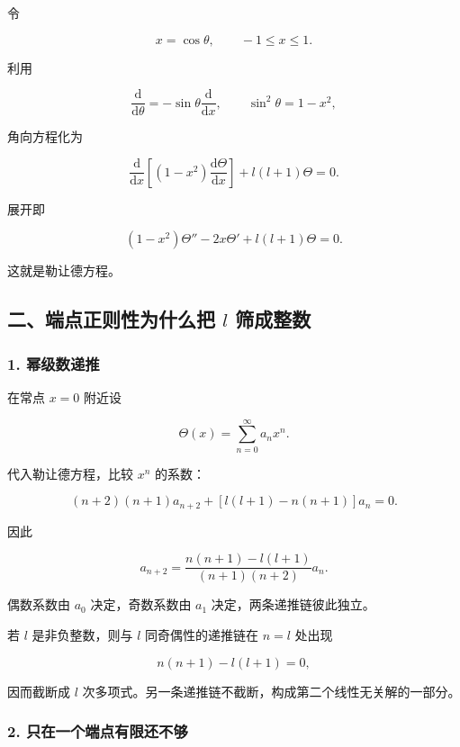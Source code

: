 令

\[
x=\cos\theta,
\qquad -1\le x\le1.
\]

利用

\[
\frac{\mathrm d}{\mathrm d\theta}
=-\sin\theta\frac{\mathrm d}{\mathrm dx},
\qquad
\sin^2\theta=1-x^2,
\]

角向方程化为

\[
\boxed{
\frac{\mathrm d}{\mathrm dx}
\left[(1-x^2)\frac{\mathrm d\Theta}{\mathrm dx}\right]
+l(l+1)\Theta=0
}.
\]

展开即

\[
\boxed{
(1-x^2)\Theta''-2x\Theta'+l(l+1)\Theta=0
}.
\]

这就是勒让德方程。

\subsection{\texorpdfstring{二、端点正则性为什么把 \(l\)
筛成整数}{二、端点正则性为什么把 l 筛成整数}}\label{m2:ux4e8cux7aefux70b9ux6b63ux5219ux6027ux4e3aux4ec0ux4e48ux628a-l-ux7b5bux6210ux6574ux6570}

\subsubsection{1. 幂级数递推}\label{m2:ux5e42ux7ea7ux6570ux9012ux63a8}

在常点 \(x=0\) 附近设

\[
\Theta(x)=\sum_{n=0}^{\infty}a_nx^n.
\]

代入勒让德方程，比较 \(x^n\) 的系数：

\[
(n+2)(n+1)a_{n+2}
+\left[l(l+1)-n(n+1)\right]a_n=0.
\]

因此

\[
\boxed{
a_{n+2}
=\frac{n(n+1)-l(l+1)}
{(n+1)(n+2)}a_n
}.
\]

偶数系数由 \(a_0\) 决定，奇数系数由 \(a_1\) 决定，两条递推链彼此独立。

若 \(l\) 是非负整数，则与 \(l\) 同奇偶性的递推链在 \(n=l\) 处出现

\[
n(n+1)-l(l+1)=0,
\]

因而截断成 \(l\)
次多项式。另一条递推链不截断，构成第二个线性无关解的一部分。

\subsubsection{2.
只在一个端点有限还不够}\label{m2:ux53eaux5728ux4e00ux4e2aux7aefux70b9ux6709ux9650ux8fd8ux4e0dux591f}

